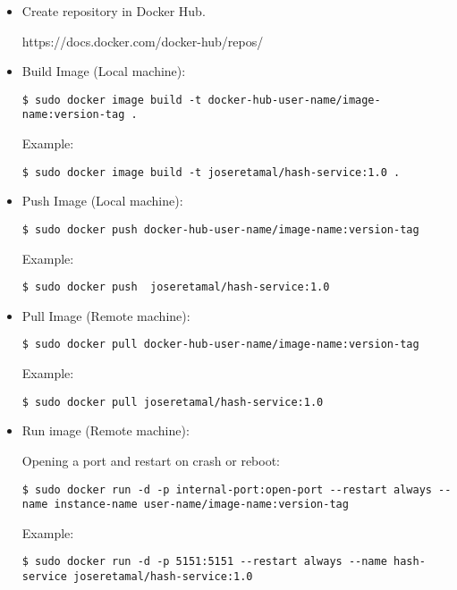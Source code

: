 \begin{itemize}
\item  Create repository in Docker Hub.

https://docs.docker.com/docker-hub/repos/
\item  Build Image (Local machine):
	
\begin{verbatim}
$ sudo docker image build -t docker-hub-user-name/image-name:version-tag .  
\end{verbatim}

Example:

\begin{verbatim}
$ sudo docker image build -t joseretamal/hash-service:1.0 . 
\end{verbatim}

\item  Push Image (Local machine):

\begin{verbatim}
$ sudo docker push docker-hub-user-name/image-name:version-tag
\end{verbatim}

Example:

\begin{verbatim}
$ sudo docker push  joseretamal/hash-service:1.0  
\end{verbatim}

\item  Pull Image (Remote machine):

\begin{verbatim}
$ sudo docker pull docker-hub-user-name/image-name:version-tag  
\end{verbatim}

Example:

\begin{verbatim}
$ sudo docker pull joseretamal/hash-service:1.0  
\end{verbatim}

\item  Run image (Remote machine):

\subitem Opening a port and restart on crash or reboot:
\begin{verbatim}
$ sudo docker run -d -p internal-port:open-port --restart always --name instance-name user-name/image-name:version-tag  
\end{verbatim}
Example:
\begin{verbatim}
$ sudo docker run -d -p 5151:5151 --restart always --name hash-service joseretamal/hash-service:1.0  
\end{verbatim}


\end{itemize}
